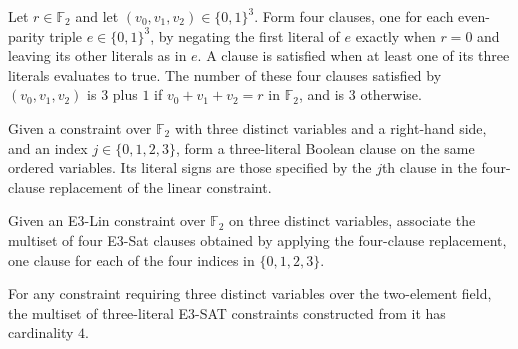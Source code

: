 \begin{theorem}
\label{FABL.sum_e3LinReplacementClauses}
\leanok
{}
Let $r\in\mathbb{F}_2$ and let $(v_0,v_1,v_2)\in\{0,1\}^3$. Form four clauses, one for
each even-parity triple $e\in\{0,1\}^3$, by negating the first literal of $e$ exactly
when $r=0$ and leaving its other literals as in $e$. A clause is satisfied when at least
one of its three literals evaluates to true. The number of these four clauses satisfied
by $(v_0,v_1,v_2)$ is $3$ plus $1$ if $v_0+v_1+v_2=r$ in $\mathbb{F}_2$, and is $3$
otherwise.
\end{theorem}

\begin{definition}
\label{FABL.e3LinConstraintToE3Sat}
\leanok
{}
Given a constraint over $\mathbb{F}_2$ with three distinct variables and a right-hand
side, and an index $j\in\{0,1,2,3\}$, form a three-literal Boolean clause on the same
ordered variables. Its literal signs are those specified by the $j$th clause in the
four-clause replacement of the linear constraint.
\end{definition}

\begin{definition}
\label{FABL.e3LinConstraintClauses}
\leanok
{}
Given an E3-Lin constraint over $\mathbb{F}_2$ on three distinct variables, associate
the multiset of four E3-Sat clauses obtained by applying the four-clause replacement,
one clause for each of the four indices in $\{0,1,2,3\}$.
\end{definition}

\begin{theorem}
\label{FABL.card_e3LinConstraintClauses}
\leanok
{}
For any constraint requiring three distinct variables over the two-element field, the
multiset of three-literal E3-SAT constraints constructed from it has cardinality $4$.
\end{theorem}

